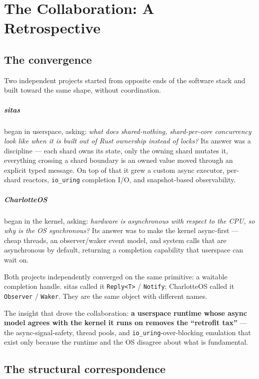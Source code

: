 \chapter{The Collaboration: A Retrospective}

\section{The convergence}

Two independent projects started from opposite ends of the software stack and
built toward the same shape, without coordination.

\paragraph{sitas} began in userspace, asking: \emph{what does shared-nothing,
shard-per-core concurrency look like when it is built out of Rust ownership
instead of locks?} Its answer was a discipline --- each shard owns its state,
only the owning shard mutates it, everything crossing a shard boundary is an
owned value moved through an explicit typed message. On top of that it grew a
custom async executor, per-shard reactors, \texttt{io\_uring} completion I/O,
and snapshot-based observability.

\paragraph{CharlotteOS} began in the kernel, asking: \emph{hardware is
asynchronous with respect to the CPU, so why is the OS synchronous?} Its answer
was to make the kernel async-first --- cheap threads, an observer/waker event
model, and system calls that are asynchronous by default, returning a
completion capability that userspace can wait on.

Both projects independently converged on the same primitive: a waitable
completion handle. sitas called it \texttt{Reply<T>} / \texttt{Notify};
CharlotteOS called it \texttt{Observer} / \texttt{Waker}. They are the same
object with different names.

The insight that drove the collaboration: \textbf{a userspace runtime whose
async model agrees with the kernel it runs on removes the ``retrofit tax''}
--- the async-signal-safety, thread pools, and \texttt{io\_uring}-over-blocking
emulation that exist only because the runtime and the OS disagree about what is
fundamental.

\section{The structural correspondence}

